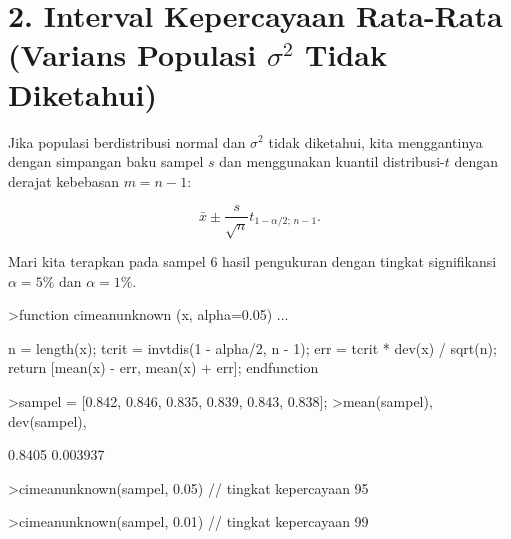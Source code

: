\documentclass[a4paper,11pt,oneside,enabledeprecatedfontcommands]{scrbook}
\newenvironment{eulernotebook}{}{}
\newcommand{\eulersubheading}[1]{\section{#1}}
\newenvironment{eulercomment}{\par\medskip\noindent}{\par\medskip}
\newenvironment{eulerformula}{}{}
\begin{document}
\begin{eulernotebook}
		\eulersubheading{2. Interval Kepercayaan Rata-Rata (Varians Populasi $\sigma^2$ Tidak Diketahui)}
		\begin{eulercomment}
			Jika populasi berdistribusi normal dan $\sigma^2$ tidak diketahui, kita menggantinya dengan simpangan
			baku sampel $s$ dan menggunakan kuantil distribusi-$t$ dengan derajat kebebasan $m = n - 1$:
		\end{eulercomment}
		\begin{eulerformula}
			\[
			\bar{x} \pm \frac{s}{\sqrt{n}} t_{1-\alpha/2; \, n-1}.
			\]
		\end{eulerformula}
		\begin{eulercomment}
			Mari kita terapkan pada sampel 6 hasil pengukuran dengan tingkat signifikansi $\alpha = 5\%$ dan $\alpha = 1\%$.
		\end{eulercomment}
		\begin{eulerprompt}
			>function cimeanunknown (x, alpha=0.05) ...
		\end{eulerprompt}
		\begin{eulerudf}
			n = length(x);
			tcrit = invtdis(1 - alpha/2, n - 1);
			err = tcrit * dev(x) / sqrt(n);
			return [mean(x) - err, mean(x) + err];
			endfunction
		\end{eulerudf}
		\begin{eulerprompt}
			>sampel = [0.842, 0.846, 0.835, 0.839, 0.843, 0.838];
			>mean(sampel), dev(sampel),
		\end{eulerprompt}
		\begin{euleroutput}
			0.8405
			0.003937
		\end{euleroutput}
		\begin{eulerprompt}
			>cimeanunknown(sampel, 0.05) // tingkat kepercayaan 95%
		\end{eulerprompt}
		\begin{euleroutput}
			[0.83637,  0.84463]
		\end{euleroutput}
		\begin{eulerprompt}
			>cimeanunknown(sampel, 0.01) // tingkat kepercayaan 99%
		\end{eulerprompt}
		\begin{euleroutput}
			[0.83402,  0.84698]
		\end{euleroutput}
		

\end{eulernotebook}
\end{document}
